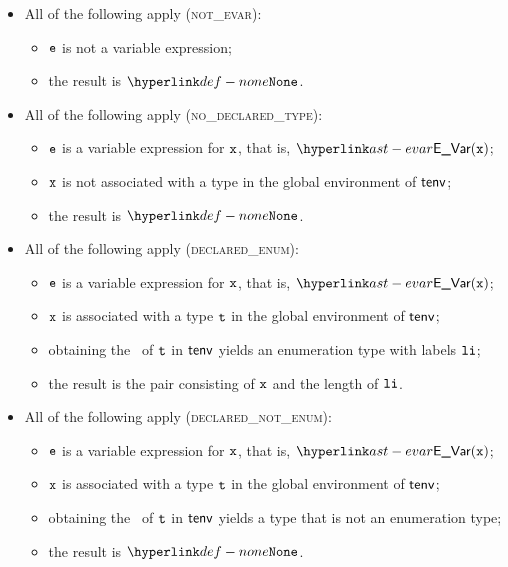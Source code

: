 \begin{itemize}
  \item All of the following apply (\textsc{not\_evar}):
  \begin{itemize}
    \item $\texttt{e}$ is not a variable expression;
    \item the result is $\None$.
  \end{itemize}

  \item All of the following apply (\textsc{no\_declared\_type}):
  \begin{itemize}
    \item $\texttt{e}$ is a variable expression for $\texttt{x}$, that is, $\EVar(\vx)$;
    \item $\texttt{x}$ is not associated with a type in the global environment of $\textsf{tenv}$;
    \item the result is $\None$.
  \end{itemize}

  \item All of the following apply (\textsc{declared\_enum}):
  \begin{itemize}
    \item $\texttt{e}$ is a variable expression for $\texttt{x}$, that is, $\EVar(\vx)$;
    \item $\texttt{x}$ is associated with a type $\texttt{t}$ in the global environment of $\textsf{tenv}$;
    \item obtaining the \underlyingtype\ of $\texttt{t}$ in $\textsf{tenv}$ yields an enumeration type with labels $\texttt{li}$\ProseOrTypeError;
    \item the result is the pair consisting of $\texttt{x}$ and the length of $\texttt{li}$.
  \end{itemize}

  \item All of the following apply (\textsc{declared\_not\_enum}):
  \begin{itemize}
    \item $\texttt{e}$ is a variable expression for $\texttt{x}$, that is, $\EVar(\vx)$;
    \item $\texttt{x}$ is associated with a type $\texttt{t}$ in the global environment of $\textsf{tenv}$;
    \item obtaining the \underlyingtype\ of $\texttt{t}$ in $\textsf{tenv}$ yields a type that is not an enumeration type;
    \item the result is $\None$.
  \end{itemize}
\end{itemize}

